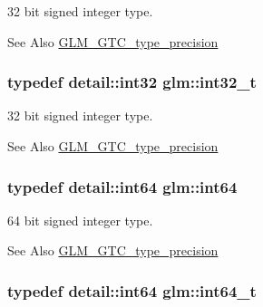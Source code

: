 32 bit signed integer type. \begin{DoxySeeAlso}{See Also}
\hyperlink{group__gtc__type__precision}{G\-L\-M\-\_\-\-G\-T\-C\-\_\-type\-\_\-precision} 
\end{DoxySeeAlso}
\hypertarget{group__gtc__type__precision_gab870c0eb6f525b0c8c4716762e0fc3a8}{
\subsubsection[{int32\-\_\-t}]{\setlength{\rightskip}{0pt plus 5cm}typedef detail\-::int32 {\bf glm\-::int32\-\_\-t}}}\label{group__gtc__type__precision_gab870c0eb6f525b0c8c4716762e0fc3a8}
32 bit signed integer type. \begin{DoxySeeAlso}{See Also}
\hyperlink{group__gtc__type__precision}{G\-L\-M\-\_\-\-G\-T\-C\-\_\-type\-\_\-precision} 
\end{DoxySeeAlso}
\hypertarget{group__gtc__type__precision_ga435d75819cce297cc5fa21bd84ef89a5}{
\subsubsection[{int64}]{\setlength{\rightskip}{0pt plus 5cm}typedef detail\-::int64 {\bf glm\-::int64}}}\label{group__gtc__type__precision_ga435d75819cce297cc5fa21bd84ef89a5}
64 bit signed integer type. \begin{DoxySeeAlso}{See Also}
\hyperlink{group__gtc__type__precision}{G\-L\-M\-\_\-\-G\-T\-C\-\_\-type\-\_\-precision} 
\end{DoxySeeAlso}
\hypertarget{group__gtc__type__precision_ga6abb23fbf4e39c50ec5341160b5da5ab}{
\subsubsection[{int64\-\_\-t}]{\setlength{\rightskip}{0pt plus 5cm}typedef detail\-::int64 {\bf glm\-::int64\-\_\-t}}}\label{group__gtc__type__precision_ga6abb23fbf4e39c50ec5341160b5da5ab}
